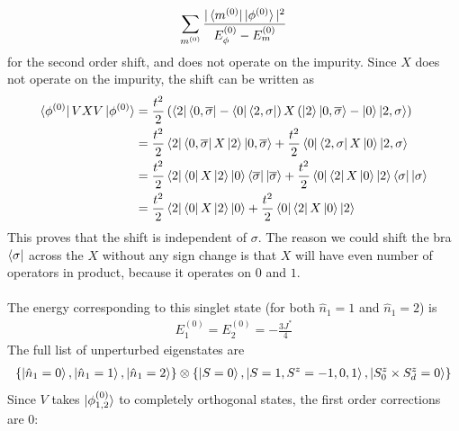 \documentclass[twoside,11pt]{report}
\numberwithin{equation}{section}
\begin{document}
\begin{equation}\begin{aligned}
	\sum_{m^{(0)}}\frac{|\bra{m^{(0)}}\ket{\phi^{(0)}}|^2}{E^{(0)}_\phi - E^{(0)}_m}
\end{aligned}\end{equation}
for the second order shift, and does not operate on the impurity. Since \(X\) does not operate on the impurity, the shift can be written as
\begin{equation}\begin{aligned}
	\bra{\phi^{(0)}} V X V \ket{\phi^{(0)}} &= \frac{t^2}{2}\left(\bra{2}\bra{0,\overline\sigma} - \bra{0}\bra{2,\sigma}\right)X\left(\ket{2}\ket{0,\overline\sigma} - \ket{0}\ket{2,\sigma}\right)\\
		 &= \frac{t^2}{2}\bra{2}\bra{0,\overline\sigma} X\ket{2}\ket{0,\overline\sigma} + \frac{t^2}{2}\bra{0}\bra{2,\sigma}X \ket{0}\ket{2,\sigma}\\
		 &= \frac{t^2}{2}\bra{2}\bra{0} X\ket{2}\ket{0}\bra{\overline\sigma}\ket{\overline\sigma} + \frac{t^2}{2}\bra{0}\bra{2}X \ket{0}\ket{2}\bra{\sigma}\ket{\sigma}\\
		 &= \frac{t^2}{2}\bra{2}\bra{0} X\ket{2}\ket{0} + \frac{t^2}{2}\bra{0}\bra{2}X \ket{0}\ket{2}
\end{aligned}\end{equation}
This proves that the shift is independent of \(\sigma\). The reason we could shift the bra \(\bra{\sigma}\) across the \(X\) without any sign change is that \(X\) will have even number of operators in product, because it operates on \(0\) and \(1\).
\\\\The energy corresponding to this singlet state (for both \(\hat n_1=1\) and \(\hat n_1=2\)) is
\begin{equation}\begin{aligned}
	E_1^{(0)} = E_2^{(0)} = -\frac{3J^*}{4}
\end{aligned}\end{equation}
The full list of unperturbed eigenstates are 
\begin{equation}\begin{aligned}
	\left\{\ket{\hat n_1 = 0}, \ket{\hat n_1=1}, \ket{\hat n_1 = 2}\right\} \otimes \left\{ \ket{S=0}, \ket{S=1, S^z=-1,0,1}, \ket{S_0^z \times S_d^z = 0}\right\} 
\end{aligned}\end{equation}
Since \(V\) takes \(\ket{\phi_{1,2}^{(0)}}\) to completely orthogonal states, the first order corrections are 0:
\end{document}
